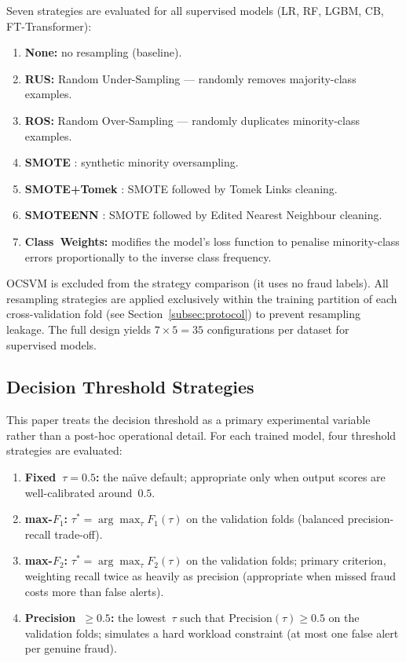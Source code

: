 \documentclass[a4paper,fleqn]{cas-sc}
\begin{document}
Seven strategies are evaluated for all supervised models (LR, RF, LGBM, CB, FT-Transformer):
\begin{enumerate}[nosep]
  \item \textbf{None:} no resampling (baseline).
  \item \textbf{RUS:} Random Under-Sampling --- randomly removes majority-class examples.
  \item \textbf{ROS:} Random Over-Sampling --- randomly duplicates minority-class examples.
  \item \textbf{SMOTE} \citep{chawla2002smote}: synthetic minority oversampling.
  \item \textbf{SMOTE+Tomek} \citep{batista2004balancing}: SMOTE followed by Tomek
    Links cleaning.
  \item \textbf{SMOTEENN} \citep{batista2004balancing}: SMOTE followed by
    Edited Nearest Neighbour cleaning.
  \item \textbf{Class~Weights:} modifies the model's loss function to penalise
    minority-class errors proportionally to the inverse class frequency.
\end{enumerate}

OCSVM is excluded from the strategy comparison (it uses no fraud labels).
All resampling strategies are applied exclusively within the training partition of each
cross-validation fold (see Section~\ref{subsec:protocol}) to prevent resampling leakage.
The full design yields $7 \times 5 = 35$ configurations per dataset for supervised models.

\subsection{Decision Threshold Strategies}
\label{subsec:threshold}

This paper treats the decision threshold as a primary experimental variable rather than
a post-hoc operational detail.
For each trained model, four threshold strategies are evaluated:
\begin{enumerate}[nosep]
  \item \textbf{Fixed~$\tau=0.5$:} the na\"{\i}ve default; appropriate only when output
    scores are well-calibrated around~$0.5$.
  \item \textbf{max-$F_1$:} $\tau^* = \arg\max_\tau F_1(\tau)$ on the validation folds
    (balanced precision-recall trade-off).
  \item \textbf{max-$F_2$:} $\tau^* = \arg\max_\tau F_2(\tau)$ on the validation folds;
    primary criterion, weighting recall twice as heavily as precision (appropriate when
    missed fraud costs more than false alerts).
  \item \textbf{Precision~$\geq 0.5$:} the lowest~$\tau$ such that
    $\text{Precision}(\tau) \geq 0.5$ on the validation folds; simulates a hard workload
    constraint (at most one false alert per genuine fraud).
\end{enumerate}
\end{document}
